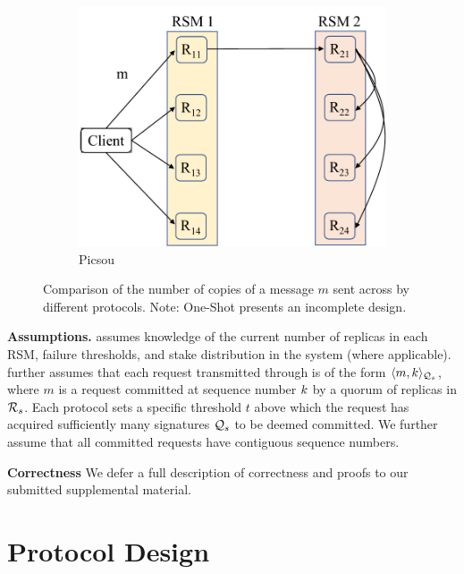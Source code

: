 \begin{figure}[t]
\begin{subfigure}[b]{0.32\columnwidth}
         \label{fig:one-to-one}
     \end{subfigure}%
     \begin{subfigure}[b]{0.32\columnwidth}
         \centering
         \includegraphics[width=1.05\textwidth]{scrooge.pdf}
         \caption{Picsou}
         \label{fig:scrooge}
     \end{subfigure}
    \caption{Comparison of the number of copies of a message $m$ sent across  by different \CCC{} protocols. 
    Note: One-Shot presents an incomplete design.}
    \label{fig:c3b-protocols}
\end{figure}


\par \textbf{Assumptions.} 
\Scrooge{} assumes knowledge of the current number of replicas in each RSM, failure thresholds, and stake distribution in the system (where applicable). \Scrooge{} further assumes that each request transmitted through \Scrooge{} is of the form $\langle m, k\rangle_{\mathcal{Q}_{s}}$, 
where $m$ is a request committed at sequence number $k$ by a quorum of replicas in \RSM{} $\mathcal{R}_{s}$. Each protocol sets a specific threshold $t$ above which the request has acquired sufficiently many signatures
$\mathcal{Q}_{s}$ to be deemed committed. We further assume that all committed requests have contiguous sequence numbers.
\par \textbf{Correctness} We defer a full description of correctness and proofs to our submitted supplemental material.

\section{Protocol Design}

